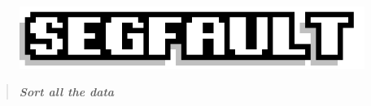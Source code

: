 \documentclass[9pt]{extarticle} %
\begin{document}

\pagestyle{fancy}
\fancyhf{}
\rhead{\today}
\addtolength\footskip{-15px}


\begin{figure}[H]
\centering\vspace{0.5cm}\includegraphics[width=0.8\linewidth]{imgs/segfault.png}
\end{figure}


\vspace{-15px}
\begin{quote}
\centering
\textbf{\textit{Sort all the data}}
\end{quote}
\vspace{10px}

\end{document}

